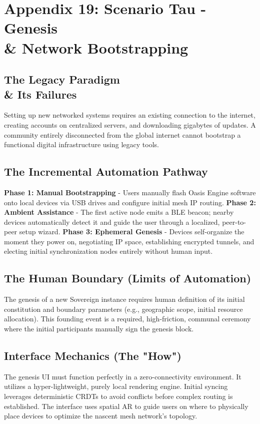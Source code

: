 \section{Appendix 19: Scenario Tau - Genesis \\\& Network Bootstrapping}

\subsection{The Legacy Paradigm \\\& Its Failures}
Setting up new networked systems requires an existing connection to the internet, creating accounts on centralized servers, and downloading gigabytes of updates. A community entirely disconnected from the global internet cannot bootstrap a functional digital infrastructure using legacy tools.

\subsection{The Incremental Automation Pathway}
\textbf{Phase 1: Manual Bootstrapping} - Users manually flash Oasis Engine software onto local devices via USB drives and configure initial mesh IP routing.
\textbf{Phase 2: Ambient Assistance} - The first active node emits a BLE beacon; nearby devices automatically detect it and guide the user through a localized, peer-to-peer setup wizard.
\textbf{Phase 3: Ephemeral Genesis} - Devices self-organize the moment they power on, negotiating IP space, establishing encrypted tunnels, and electing initial synchronization nodes entirely without human input.

\subsection{The Human Boundary (Limits of Automation)}
The genesis of a new Sovereign instance requires human definition of its initial constitution and boundary parameters (e.g., geographic scope, initial resource allocation). This founding event is a required, high-friction, communal ceremony where the initial participants manually sign the genesis block.

\subsection{Interface Mechanics (The "How")}
The genesis UI must function perfectly in a zero-connectivity environment. It utilizes a hyper-lightweight, purely local rendering engine. Initial syncing leverages deterministic CRDTs to avoid conflicts before complex routing is established. The interface uses spatial AR to guide users on where to physically place devices to optimize the nascent mesh network's topology.

